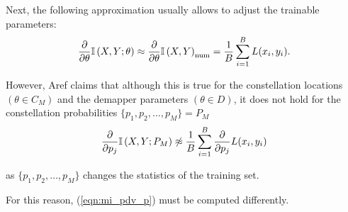 \documentclass[english,aspectratio=1610,9pt,helvet,nicetitles]{ICEbeamerTUMCD}
\begin{document}
\begin{frame}
	Next, the following approximation usually allows to adjust the trainable parameters:
	\begin{align}
		\pdv{\theta} \mathbb{I} \left(X , Y ; \theta \right) \approx \pdv{\theta} \mathbb{I} \left(X , Y\right)_{\text{num}} = \dfrac{1}{B} \sum \limits_{i = 1}^{B} L(x_i, y_i).
	\end{align}
	
	However, Aref claims that although this is true for the constellation locations $(\theta \in C_M)$ and the demapper parameters $(\theta \in D)$, it does not hold for the constellation probabilities $\{p_1, p_2, \dots, p_M\} = P_M$
	\begin{align}
	\label{eqn:mi_pdv_p}
		\pdv{p_j} \mathbb{I} \left(X , Y ; P_M \right) \not\approx \dfrac{1}{B} \sum \limits_{i = 1}^{B} \pdv{p_j} L(x_i, y_i)
	\end{align}
	
	as $\{p_1, p_2, \dots, p_M\}$ changes the statistics of the training set.
	
	For this reason, (\ref{eqn:mi_pdv_p}) must be computed differently.
	
	\end{frame}
\end{document}
